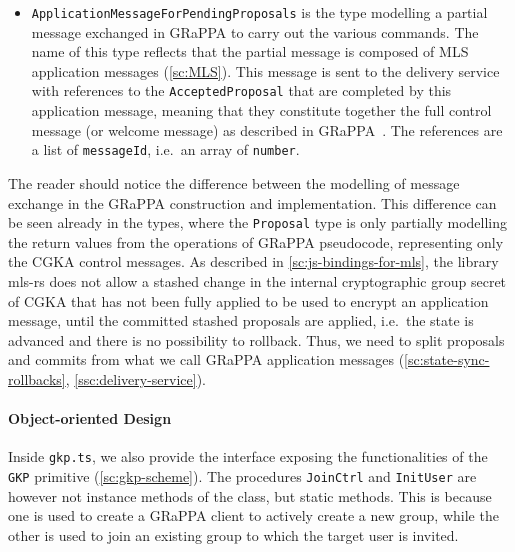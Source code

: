 \begin{itemize}
    \item \texttt{ApplicationMessageForPendingProposals} is the type modelling a partial message exchanged in GRaPPA
    to carry out the various commands. The name of this type reflects that the partial message is composed of 
    MLS application messages (\cref{sc:MLS}). This message is sent to the delivery service
    with references to the \texttt{AcceptedProposal} that are completed by this application
    message, meaning that they constitute together the full control message (or welcome message) as described in
    GRaPPA~\cite{GKP}. The references are a list of \texttt{messageId}, i.e.\ an array of \texttt{number}.

\end{itemize}

The reader should notice the difference between the modelling of message exchange
in the GRaPPA construction and implementation. This
difference can be seen already in the types, where the \texttt{Proposal} type is only 
partially modelling the return values from the operations of 
GRaPPA pseudocode, representing only the CGKA control messages. 
As described in \cref{sc:js-bindings-for-mls},
the library mls-rs does not allow a stashed change in the internal 
cryptographic group secret of CGKA that has not been fully applied
to be used to encrypt an application message,
until the committed stashed proposals are applied,
i.e.\ the state is advanced and there is no possibility to rollback.
Thus, we need to split proposals and commits from what we call 
GRaPPA application messages (\cref{sc:state-sync-rollbacks}, \cref{ssc:delivery-service}).

\paragraph{Object-oriented Design}
Inside \texttt{gkp.ts}, we also provide the interface exposing the functionalities 
of the \texttt{GKP} primitive (\cref{sc:gkp-scheme}). 
The procedures \texttt{JoinCtrl} and \texttt{InitUser} are however not instance
methods of the class, but static methods. This is because one is used to create
a GRaPPA client to actively create a new group, while the other is used to
join an existing group to which the target user is invited. 

